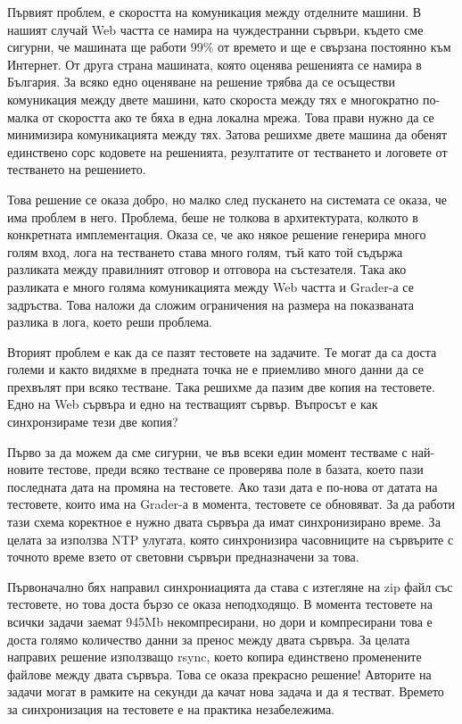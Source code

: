 \documentclass[a4paper,12pt]{article}
\begin{document}
  Първият проблем, е скоростта на комуникация между отделните машини. В нашият случай Web частта се намира на чуждестранни сървъри, където сме сигурни, че машината ще работи 99\% от времето и ще е свързана постоянно към Интернет. От друга страна машината, която оценява решенията се намира в България. За всяко едно оценяване на решение трябва да се осъществи комуникация между двете машини, като скороста между тях е многократно по-малка от скоростта ако те бяха в една локална мрежа. Това прави нужно да се минимизира комуникацията между тях. Затова решихме двете машина да обенят единствено сорс кодовете на решенията, резултатите от тестването и логовете от тестването на решението.
  
  Това решение се оказа добро, но малко след пускането на системата се оказа, че има проблем в него. Проблема, беше не толкова в архитектурата, колкото в конкретната имплементация. Оказа се, че ако някое решение генерира много голям вход, лога на тестването става много голям, тъй като той съдържа разликата между правилният отговор и отговора на състезателя. Така ако разликата е много голяма комуникацията между Web частта и Grader-а се задръства. Това наложи да сложим ограничения на размера на показваната разлика в лога, което реши проблема.
  
  Вторият проблем е как да се пазят тестовете на задачите. Те могат да са доста големи и както видяхме в предната точка не е приемливо много данни да се прехвълят при всяко тестване. Така решихме да пазим две копия на тестовете. Едно на Web сървъра и едно на тестващият сървър. Въпросът е как синхронзираме тези две копия?
  
  Първо за да можем да сме сигурни, че във всеки един момент тестваме с най-новите тестове, преди всяко тестване се проверява поле в базата, което пази последната дата на промяна на тестовете. Ако тази дата е по-нова от датата на тестовете, които има на Grader-а в момента, тестовете се обновяват. За да работи тази схема коректное е нужно двата сървъра да имат синхронизирано време. За целата за използва NTP улугата, която синхронизира часовниците на сървърите с точното време взето от световни сървъри предназначени за това.
  
  Първоначално бях направил синхрониацията да става с изтегляне на zip файл със тестовете, но това доста бързо се оказа неподходящо. В момента тестовете на всички задачи заемат 945Mb некомпресирани, но дори и компресирани това е доста голямо количество данни за пренос между двата сървъра. За целата направих решение използващо rsync, което копира единствено променените файлове между двата сървъра. Това се оказа прекрасно решение! Авторите на задачи могат в рамките на секунди да качат нова задача и да я тестват. Времето за синхронизация на тестовете е на практика незабележима.
  
\end{document}
